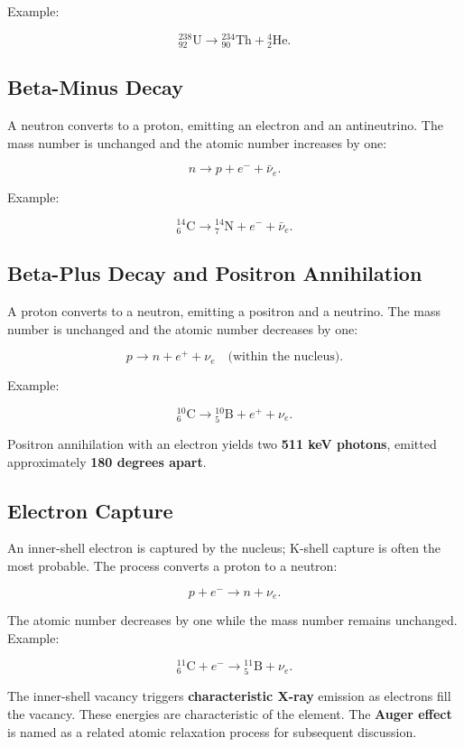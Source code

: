 \documentclass[11pt,a4paper]{article}
\let\originalsubsection\subsection
\renewcommand{\subsection}{\Needspace{8\baselineskip}\originalsubsection}
\begin{document}
Example:

\[{}^{238}_{92}\mathrm{U}\longrightarrow{}^{234}_{90}\mathrm{Th}+{}^{4}_{2}\mathrm{He}.\]

\subsection{Beta-Minus Decay}
A neutron converts to a proton, emitting an electron and an antineutrino. The mass number is unchanged and the atomic number increases by one:

\[n\longrightarrow p+e^-+\bar\nu_e.\]

Example:

\[{}^{14}_{6}\mathrm{C}\longrightarrow{}^{14}_{7}\mathrm{N}+e^-+\bar\nu_e.\]

\subsection{Beta-Plus Decay and Positron Annihilation}
A proton converts to a neutron, emitting a positron and a neutrino. The mass number is unchanged and the atomic number decreases by one:

\[p\longrightarrow n+e^++\nu_e\quad\text{(within the nucleus).}\]

Example:

\[{}^{10}_{6}\mathrm{C}\longrightarrow{}^{10}_{5}\mathrm{B}+e^++\nu_e.\]

Positron annihilation with an electron yields two \textbf{511 keV photons}, emitted approximately \textbf{180 degrees apart}.

\subsection{Electron Capture}
An inner-shell electron is captured by the nucleus; K-shell capture is often the most probable. The process converts a proton to a neutron:

\[p+e^-\longrightarrow n+\nu_e.\]

The atomic number decreases by one while the mass number remains unchanged. Example:

\[{}^{11}_{6}\mathrm{C}+e^-\longrightarrow{}^{11}_{5}\mathrm{B}+\nu_e.\]

The inner-shell vacancy triggers \textbf{characteristic X-ray} emission as electrons fill the vacancy. These energies are characteristic of the element. The \textbf{Auger effect} is named as a related atomic relaxation process for subsequent discussion.
\end{document}
